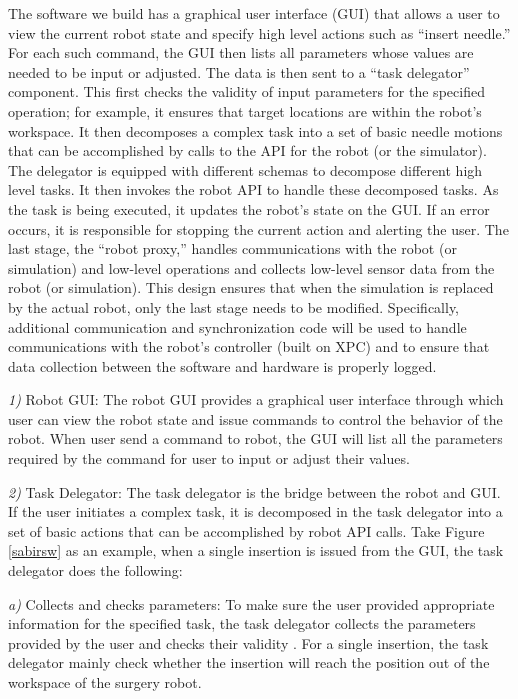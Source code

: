 The software we build has a graphical user interface (GUI) that allows a user to view the current robot state and specify high level actions such as ``insert needle.'' For each such command, the GUI then lists all parameters whose values are needed to be input or adjusted. The data is then sent to a ``task delegator'' component. This first checks the validity of input parameters for the specified operation; for example, it ensures that target locations are within the robot’s workspace. It then decomposes a complex task into a set of basic needle motions that can be accomplished by calls to the API for the robot (or the simulator). The delegator is equipped with different schemas to decompose different high level tasks. It then invokes the robot API to handle these decomposed tasks. As the task is being executed, it updates the robot’s state on the GUI. If an error occurs, it is responsible for stopping the current action and alerting the user. The last stage, the ``robot proxy,'' handles communications with the robot (or simulation) and low-level operations and collects low-level sensor data from the robot (or simulation). This design ensures that when the simulation is replaced by the actual robot, only the last stage needs to be modified. Specifically, additional communication and synchronization code will be used to handle communications with the robot’s controller (built on XPC) and to ensure that data collection between the software and hardware is properly logged.

\emph{1)}	Robot GUI: The robot GUI provides a graphical user interface through which user can view the robot state and issue commands to control the behavior of the robot. When user send a command to robot, the GUI will list all the parameters required by the command for user to input or adjust their values.

\emph{2)}	Task Delegator: The task delegator is the bridge between the robot and GUI.  If the user initiates a complex task, it is decomposed in the task delegator into a set of basic actions that can be accomplished by robot API calls. Take Figure \ref{sabirsw} as an example, when a single insertion is issued from the GUI, the task delegator does the following:

\emph{a)}	Collects and checks parameters: To make sure the user provided appropriate information for the specified task, the task delegator collects the parameters provided by the user and checks their validity . For a single insertion, the task delegator mainly check whether the insertion will reach the position out of the workspace of the surgery robot.

